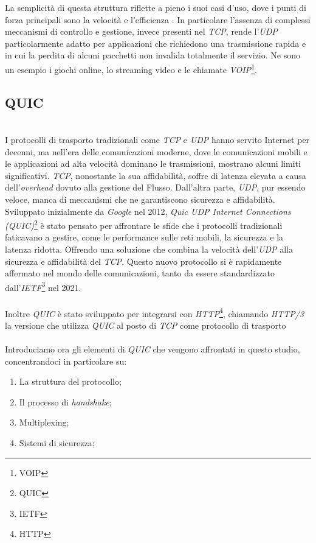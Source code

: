 \noindent La semplicità di questa struttura riflette a pieno i suoi casi d'uso, dove i punti di forza principali sono la velocità e l'efficienza \cite{site:udp}.
In particolare l'assenza di complessi meccanismi di controllo e gestione, invece presenti nel \emph{TCP}, rende l'\emph{UDP} particolarmente adatto per applicazioni che richiedono una trasmissione rapida e in cui la perdita di alcuni pacchetti non invalida totalmente il servizio.
Ne sono un esempio i giochi online, lo streaming video e le chiamate \emph{VOIP}\footnote{\gls{VOIP}}.

\subsection{QUIC}
~\\
\indent I protocolli di trasporto tradizionali come \emph{TCP} e \emph{UDP} hanno servito Internet per decenni, ma nell'era delle comunicazioni moderne, dove le comunicazioni mobili e le applicazioni ad alta velocità dominano le trasmissioni, mostrano alcuni limiti significativi.
\emph{TCP}, nonostante la sua affidabilità, soffre di latenza elevata a causa dell'\emph{overhead} dovuto alla gestione del Flusso. 
Dall'altra parte, \emph{UDP}, pur essendo veloce, manca di meccanismi che ne garantiscono sicurezza e affidabilità.
\\
Sviluppato inizialmente da \emph{Google} nel 2012, \emph{Quic UDP Internet Connections (QUIC)}\footnote{\gls{QUIC}} è stato pensato per affrontare le sfide che i protocolli tradizionali faticavano a gestire, come le performance sulle reti mobili, la sicurezza e la latenza ridotta.
Offrendo una soluzione che combina la velocità dell'\emph{UDP} alla sicurezza e affidabilità del \emph{TCP}. Questo nuovo protocollo si è rapidamente affermato nel mondo delle comunicazioni, tanto da essere standardizzato dall'\emph{IETF}\footnote{\gls{IETF}} nel 2021.
\\\\
Inoltre \emph{QUIC} è stato sviluppato per integrarsi con \emph{HTTP}\footnote{\gls{HTTP}}, chiamando \emph{HTTP/3} la versione che utilizza \emph{QUIC} al posto di
\emph{TCP} come protocollo di trasporto \cite{site:HTTP-over-QUIC} \\\\
\noindent Introduciamo ora gli elementi di \emph{QUIC} che vengono affrontati in questo studio, concentrandoci in particolare su:
\begin{enumerate}
    \item La struttura del protocollo;
    \item Il processo di \emph{handshake};
    \item Multiplexing;
    \item Sistemi di sicurezza;
\end{enumerate}

